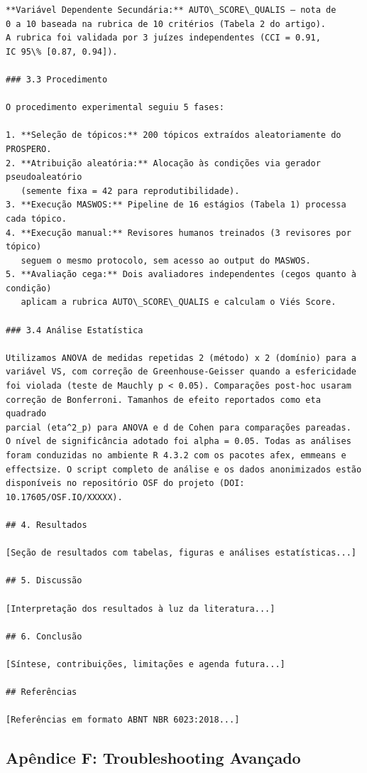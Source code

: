 \begin{lstlisting}[caption={Artigo exemplo gerado pelo MASWOS (excerto da introdução e metodologia)},label={lst:artigo-exemplo}]
**Variável Dependente Secundária:** AUTO\_SCORE\_QUALIS — nota de
0 a 10 baseada na rubrica de 10 critérios (Tabela 2 do artigo).
A rubrica foi validada por 3 juízes independentes (CCI = 0.91,
IC 95\% [0.87, 0.94]).

### 3.3 Procedimento

O procedimento experimental seguiu 5 fases:

1. **Seleção de tópicos:** 200 tópicos extraídos aleatoriamente do PROSPERO.
2. **Atribuição aleatória:** Alocação às condições via gerador pseudoaleatório
   (semente fixa = 42 para reprodutibilidade).
3. **Execução MASWOS:** Pipeline de 16 estágios (Tabela 1) processa cada tópico.
4. **Execução manual:** Revisores humanos treinados (3 revisores por tópico)
   seguem o mesmo protocolo, sem acesso ao output do MASWOS.
5. **Avaliação cega:** Dois avaliadores independentes (cegos quanto à condição)
   aplicam a rubrica AUTO\_SCORE\_QUALIS e calculam o Viés Score.

### 3.4 Análise Estatística

Utilizamos ANOVA de medidas repetidas 2 (método) x 2 (domínio) para a
variável VS, com correção de Greenhouse-Geisser quando a esfericidade
foi violada (teste de Mauchly p < 0.05). Comparações post-hoc usaram
correção de Bonferroni. Tamanhos de efeito reportados como eta quadrado
parcial (eta^2_p) para ANOVA e d de Cohen para comparações pareadas.
O nível de significância adotado foi alpha = 0.05. Todas as análises
foram conduzidas no ambiente R 4.3.2 com os pacotes afex, emmeans e
effectsize. O script completo de análise e os dados anonimizados estão
disponíveis no repositório OSF do projeto (DOI: 10.17605/OSF.IO/XXXXX).

## 4. Resultados

[Seção de resultados com tabelas, figuras e análises estatísticas...]

## 5. Discussão

[Interpretação dos resultados à luz da literatura...]

## 6. Conclusão

[Síntese, contribuições, limitações e agenda futura...]

## Referências

[Referências em formato ABNT NBR 6023:2018...]
\end{lstlisting}

\subsection{Apêndice F: Troubleshooting Avançado}
\label{sec:apendice-troubleshooting}


